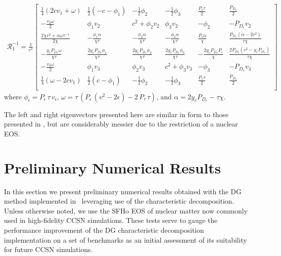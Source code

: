 \documentclass[onecolumn]{aastex62}
\begin{document}
\begin{align*}
  \mathcal{R}_{1}^{-1} = \frac{1}{c^2}
  \left[
  \begin{array}{cccccc}
   \frac{1}{4} (2 c  v_{1}+\omega ) & \frac{1}{2} (-c- \phi_{1} ) & -\frac{1}{2} \phi_{2}
    & -\frac{1}{2} \phi_{3}  & \frac{P_{\epsilon} \tau }{2} & \frac{P_{D_{e}}}{2}
     \\
   -\frac{v_{2} \omega }{2} & \phi_{1} v_{2}  & c^2+\phi_{2} v_{2}  &
     \phi_{3} v_{2}  & -\phi_{2}  & -P_{D_{e}} v_{2}
     \\
   \frac{2 \chi  c^2+\alpha  \omega \tau^{-1} }{2 \chi } & -\frac{\phi_{1} \alpha  }{\chi \tau } &
     -\frac{\phi_{2} \alpha  }{\chi \tau } & -\frac{\phi_{3} \alpha }{\chi \tau } &
     \frac{P_{\epsilon} \alpha }{\chi } & \frac{P_{D_{e}} \left(\alpha -2 c^2\right)}{\tau \chi }
      \\
   -\frac{y_{e} P_{D_{e}} \omega }{\chi \tau } & \frac{2 y_{e} P_{D_{e}} \phi_{1} }{\chi \tau } & \frac{2 y_{e} P_{D_{e}}
     \phi_{2} }{\chi \tau} & \frac{2 y_{e} P_{D_{e}} \phi_{3} }{\chi \tau} & -\frac{2 y_{e}
     P_{D_{e}} P_{\epsilon} }{\chi } & \frac{2 P_{D_{e}} \left(c^2-y_{e} P_{D_{e}} \right)}{\tau  \chi }
      \\
   -\frac{v_{3} \omega }{2} & \phi_{1} v_{3}  & \phi_{2} v_{3}   &
     c^2+\phi_{3} v_{3}  & -\phi_{3}  & -P_{D_{e}} v_{3}
      \\
   \frac{1}{4} (\omega -2 c  v_{1}) & \frac{1}{2} (c-\phi_{1} ) & -\frac{1}{2} \phi_{2}
       & -\frac{1}{2} \phi_{3}  & \frac{P_{\epsilon} \tau }{2} & \frac{P_{D_{e}}}{2}
     \\
  \end{array}
  \right]
\end{align*}
where $\phi_{i} = P_{\epsilon}\,\tau\, v_{i}$,
$\omega = \tau\, (P_{\epsilon}\,(v^2 - 2\epsilon) - 2\,P_{\tau}\,\tau)$, and
$\alpha = 2 y_{e} P_{D_{e}} - \tau \chi$.


The left and right eigenvectors presented here are similar in form to those
presented in \citet{schaal:2015}, but are considerably messier due to the
restriction of a nuclear EOS.

\section{Preliminary Numerical Results}
\label{sec:results}
In this section we present preliminary numerical results obtained with the DG
method implemented in \thornado\, leveraging use of the characteristic
decomposition. Unless otherwise noted, we use the SFHo EOS of
nuclear matter \citep{steiner:2013} now commonly used in high-fidelity CCSN simulations.
These tests serve to gauge the performance improvement of the
DG characteristic decomposition implementation on a set of benchmarks as an initial
assessment of its suitability for future CCSN simulations.
\end{document}

